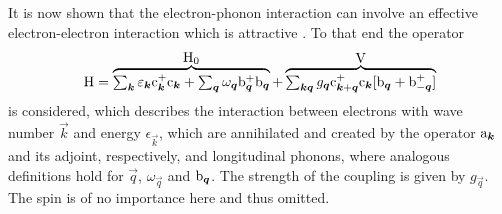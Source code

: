 It is now shown that the electron-phonon interaction can involve an effective
electron-electron interaction which is attractive \cite{Froehlich52}. To that
end the  operator
%
\begin{gather*}
    \op H = \hyper{
        \sum_{\vec k} \epsilon_{\vec k} \op c_{\vec k}^+ \op c_{\vec k} +
        \sum_{\vec q} \omega_{\vec q} \op b_{\vec q}^+ \op b_{\vec q}
    }{\op H_0} + \hyper{
        \sum_{\vec k \vec q} g_{\vec q} \op c_{\vec k + \vec q}^+ \op c_{\vec k}
        [\op b_{\vec q} + \op b_{-\vec q}^+]
    }{\op V}
\end{gather*}
%
is considered, which describes the interaction between electrons with wave
number $\vec k$ and energy $\epsilon_{\vec k}$, which are annihilated and
created by the  operator $\mathrm a_{\boldsymbol k}$ and its adjoint,
respectively, and longitudinal phonons, where analogous definitions hold for
$\vec q$, $\omega_{\vec q}$ and $\mathrm b_{\boldsymbol q}$. The strength of the coupling
is given by $g_{\vec q}$. The spin is of no importance here and thus omitted.

